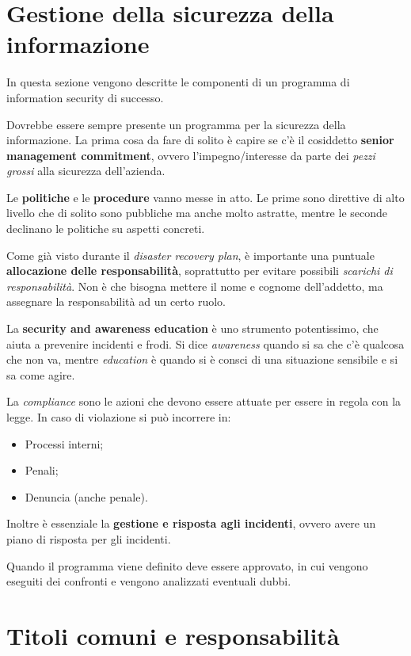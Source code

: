 \section{Gestione della sicurezza della informazione}

In questa sezione vengono descritte le componenti di un programma di
information security di successo.

Dovrebbe essere sempre presente un programma per la sicurezza della
informazione. La prima cosa da fare di solito è capire se c'è il cosiddetto
\textbf{senior management commitment}, ovvero l'impegno/interesse da parte dei
\emph{pezzi grossi} alla sicurezza dell'azienda.

Le \textbf{politiche} e le \textbf{procedure} vanno messe in atto.
Le prime sono direttive di alto livello che di solito sono pubbliche ma anche
molto astratte, mentre le seconde declinano le politiche su aspetti concreti.

Come già visto durante il \textit{disaster recovery plan}, è importante una
puntuale \textbf{allocazione delle responsabilità}, soprattutto per evitare
possibili \emph{scarichi di responsabilità}. Non è che bisogna mettere il nome
e cognome dell'addetto, ma assegnare la responsabilità ad un certo ruolo.

La \textbf{security and awareness education} è uno strumento potentissimo, che
aiuta a prevenire incidenti e frodi. Si dice \textit{awareness} quando si sa
che c'è qualcosa che non va, mentre \textit{education} è quando si è consci di
una situazione sensibile e si sa come agire.

La \textit{compliance} sono le azioni che devono essere attuate per
essere in regola con la legge. In caso di violazione si può incorrere in:
\begin{itemize}
  \item Processi interni;
  \item Penali;
  \item Denuncia (anche penale).
\end{itemize}
Inoltre è essenziale la \textbf{gestione e risposta agli incidenti},
ovvero avere un piano di risposta per gli incidenti.

Quando il programma viene definito deve essere approvato, in cui vengono
eseguiti dei confronti e vengono analizzati eventuali dubbi.

\section{Titoli comuni e responsabilità}

